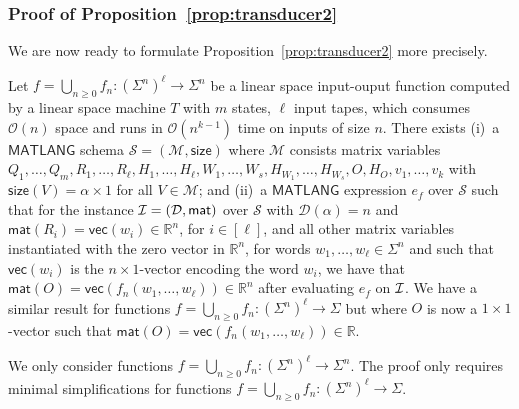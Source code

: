 \subsubsection{Proof of Proposition~\ref{prop:transducer2}}
We are now ready to formulate  Proposition~\ref{prop:transducer2} more precisely.

\begin{proposition}
Let $f=\bigcup_{n\geq 0}f_n:(\Sigma^n)^\ell\to \Sigma^n$ be a linear space input-ouput function 
computed by a linear space  machine $T$ with $m$ states, $\ell$ input tapes, which consumes 
$\mathcal{O}(n)$ space and runs in $\mathcal{O}(n^{k-1})$ time on inputs of size $n$. 
There exists (i)~a $\mathsf{MATLANG}$ 
schema $\mathcal{S}=(\mathcal{M},\textsf{size})$ where $\mathcal{M}$ consists matrix 
variables
$Q_1,\ldots,Q_m,R_1,\ldots,R_\ell,H_1,\ldots,H_\ell,W_1,\ldots,W_s,H_{W_1},\ldots,H_{W_s},O,H_O, v_1,\ldots,\allowbreak v_{k}$ 
with $\mathsf{size}(V)=\alpha\times 1$ for all $V\in\mathcal{M}$; and (ii)~a $\mathsf{MATLANG}$ 
expression $e_f$ over $\mathcal{S}$ such that for the instance 
$\mathcal{I}=(\mathcal{D},\textsf{mat})$ over $\mathcal{S}$ with $\mathcal{D}(\alpha)=n$ and 
$\mathsf{mat}(R_i)=\mathsf{vec}(w_i)\in \mathbb{R}^n$, for $i\in[\ell]$, and all other matrix variables instantiated with the zero vector in $\mathbb{R}^n$,
for words $w_1,\ldots,w_\ell\in\Sigma^n$ and such that $\mathsf{vec}(w_i)$ is the $n\times 1$-vector 
encoding the word $w_i$, we have that  $\mathsf{mat}(O)=\mathsf{vec}(f_n(w_1,\ldots,w_\ell))\in\mathbb{R}^n$ 
after evaluating $e_f$ on $\mathcal{I}$. We have a similar result for functions $f=\bigcup_{n\geq 0}f_n:(\Sigma^n)^\ell\to \Sigma$
but where $O$ is now a $1\times 1$-vector such that $\mathsf{mat}(O)=\mathsf{vec}(f_n(w_1,\ldots,w_\ell))\in\mathbb{R}$. 
\end{proposition}

We only consider functions $f=\bigcup_{n\geq 0}f_n:(\Sigma^n)^\ell\to \Sigma^n$. The proof only requires
minimal simplifications for functions  $f=\bigcup_{n\geq 0}f_n:(\Sigma^n)^\ell\to \Sigma$.

